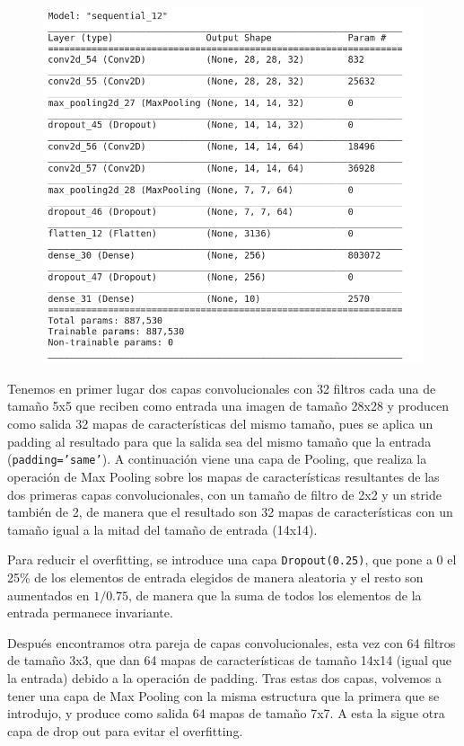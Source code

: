 \documentclass[a4paper,11pt]{article}
\begin{document}
\begin{figure}[H]
	\centering
	\includegraphics[width=0.8\linewidth]{img/cnn1}
	\caption{}
	\label{fig:cnn1}
\end{figure}

Tenemos en primer lugar dos capas convolucionales con 32 filtros cada una de tamaño 5x5 que reciben como entrada una imagen de tamaño 28x28 y producen como salida 32 mapas de características del mismo tamaño, pues se aplica un padding al resultado para que la salida sea del mismo tamaño que la entrada (\texttt{padding='same'}). A continuación viene una capa de Pooling, que realiza la operación de Max Pooling sobre los mapas de características resultantes de las dos primeras capas convolucionales, con un tamaño de filtro de 2x2 y un stride también de 2, de manera que el resultado son 32 mapas de características con un tamaño igual a la mitad del tamaño de entrada (14x14). 

Para reducir el overfitting, se introduce una capa \texttt{Dropout(0.25)}, que pone a 0 el 25\% de los elementos de entrada elegidos de manera aleatoria y el resto son aumentados en $ 1/0.75 $, de manera que la suma de todos los elementos de la entrada permanece invariante. 

Después encontramos otra pareja de capas convolucionales, esta vez con 64 filtros de tamaño 3x3, que dan 64 mapas de características de tamaño 14x14 (igual que la entrada) debido a la operación de padding. Tras estas dos capas, volvemos a tener una capa de Max Pooling con la misma estructura que la primera que se introdujo, y produce como salida 64 mapas de tamaño 7x7. A esta la sigue otra capa de drop out para evitar el overfitting. 
\end{document}
